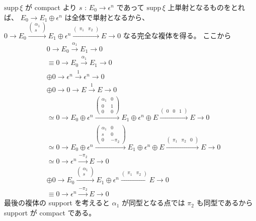 \documentclass[dvipdfmx]{jsarticle}
\begin{document}
\begin{Proof}
\itemprof
  \(\text{supp} \, \xi\) が compact より \(s\) : \(E_0 \to \epsilon^n\) であって \(\text{supp} \,\xi\) 上単射となるものをとれば、 \(E_0 \to E_1 \oplus \epsilon^n\) は全体で単射となるから、
  \(
    0 \to E_0 \overset{
        \begin{pmatrix}
        \alpha_1 \\
        s
        \end{pmatrix}
      }{\to} E_1 \oplus \epsilon^n \overset{
        \begin{pmatrix}
          \pi_1 & \pi_2
        \end{pmatrix}
      }{\to} E \to 0
  \)
  なる完全な複体を得る。
  ここから
  \begin{align*}
    & 0 \to E_0 \overset{\alpha_1}{\to} E_1 \to 0 \\
    &\equiv 0 \to E_0 \overset{\alpha_1}{\to} E_1 \to 0 \\
    &\oplus 0 \to \epsilon^n \overset{1}{\to} \epsilon^n \to 0 \\
    &\oplus 0 \to 0 \to E \overset{1}{\to} E \to 0 \\
    &\simeq 0 \to E_0 \oplus \epsilon^n \overset{
      \begin{pmatrix}
        \alpha_1 & 0\\
        0 & 1 \\
        0 & 0
      \end{pmatrix}
    }{\to} E_1 \oplus \epsilon^n \oplus E \overset{
      \begin{pmatrix}
        0 & 0 & 1
      \end{pmatrix}
    }{\to} E \to 0 \\
    &\simeq 0 \to E_0 \oplus \epsilon^n \overset{
      \begin{pmatrix}
      \alpha_1 & 0 \\
      s & 0 \\
      0 & -\pi_2
      \end{pmatrix}
    }{\to} E_1 \oplus \epsilon^n \oplus E \overset{
      \begin{pmatrix}
        \pi_1 & \pi_2 & 0
      \end{pmatrix}
    }{\to} E \to 0 \\
    &\simeq 0 \to \epsilon^n \overset{-\pi_2}{\to} E \to 0 \\
    &\oplus 
    0 \to E_0 \overset{
      \begin{pmatrix}
      \alpha_1 \\
      s
      \end{pmatrix}
    }{\to} E_1 \oplus \epsilon^n \overset{
      \begin{pmatrix}
        \pi_1 & \pi_2
      \end{pmatrix}
    }{\to} E \to 0 \\
    &\equiv 0 \to \epsilon^n \overset{-\pi_2}{\to} E \to 0
  \end{align*}
  最後の複体の support を考えると \(\alpha_1\) が同型となる点では \(\pi_2\) も同型であるから support が compact である。
\end{Proof}
\end{document}
